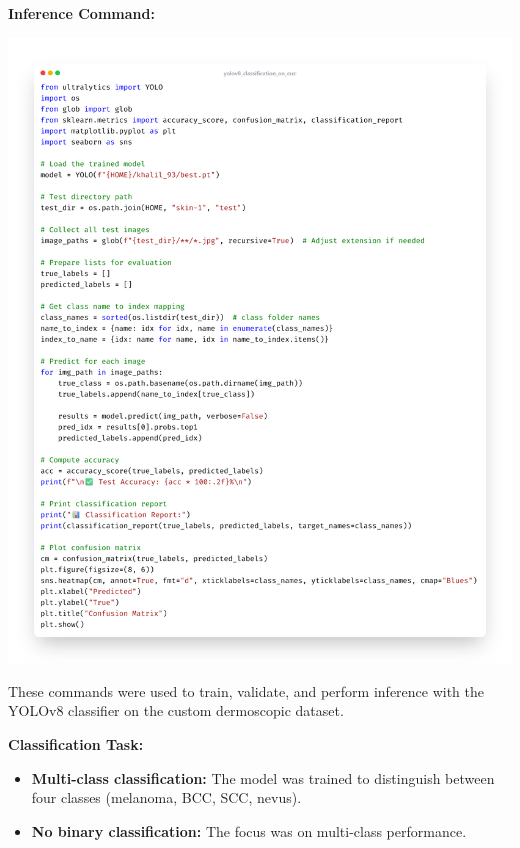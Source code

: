\documentclass[a4paper,12pt]{report}
\begin{document}
\begin{spacing}{1.5}
    \textbf{Inference Command:}

    \begin{center}
        \includegraphics[width=\textwidth,keepaspectratio]{code/inference.png}
    \end{center}
    
    These commands were used to train, validate, and perform inference with the YOLOv8 classifier on the custom dermoscopic dataset.
        
    \textbf{Classification Task:}
    \begin{itemize}
        \item \textbf{Multi-class classification:} The model was trained to distinguish between four classes (melanoma, BCC, SCC, nevus).
        \item \textbf{No binary classification:} The focus was on multi-class performance.
    \end{itemize}
    

\end{spacing}
\end{document}
